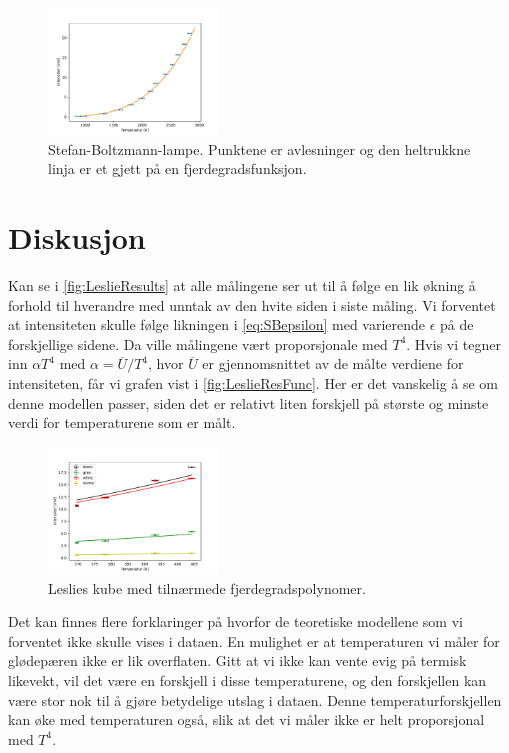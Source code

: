 \begin{figure}
  \centering
  \includegraphics[width=0.4\textwidth]{../code/SB_lamp.pdf}
  \caption{Stefan-Boltzmann-lampe. Punktene er avlesninger og den heltrukkne linja er et gjett på en fjerdegradsfunksjon.}
  \label{fig:SBlampResults}
\end{figure}


\section{Diskusjon}
Kan se i \autoref{fig:LeslieResults} at alle målingene ser ut til å følge en lik økning å forhold til hverandre med unntak av den hvite siden i siste måling. Vi forventet at intensiteten skulle følge likningen i \eqref{eq:SBepsilon} med varierende $\epsilon$ på de forskjellige sidene. Da ville målingene vært proporsjonale med $T^{4}$. Hvis vi tegner inn $\alpha T^{4}$ med $\alpha=\overline{U} / T^{4}$, hvor $\overline{U}$ er gjennomsnittet av de målte verdiene for intensiteten, får vi grafen vist i \autoref{fig:LeslieResFunc}. Her er det vanskelig å se om denne modellen passer, siden det er relativt liten forskjell på største og minste verdi for temperaturene som er målt.

\begin{figure}
  \centering
  \includegraphics[width=0.4\textwidth]{../code/LC_graphs.pdf}
  \caption{Leslies kube med tilnærmede fjerdegradspolynomer.}
  \label{fig:LeslieResFunc}
\end{figure}

Det kan finnes flere forklaringer på hvorfor de teoretiske modellene som vi forventet ikke skulle vises i dataen. En mulighet er at temperaturen vi måler for glødepæren ikke er lik overflaten. Gitt at vi ikke kan vente evig på termisk likevekt, vil det være en forskjell i disse temperaturene, og den forskjellen kan være stor nok til å gjøre betydelige utslag i dataen. Denne temperaturforskjellen kan øke med temperaturen også, slik at det vi måler ikke er helt proporsjonal med $T^{4}$.

